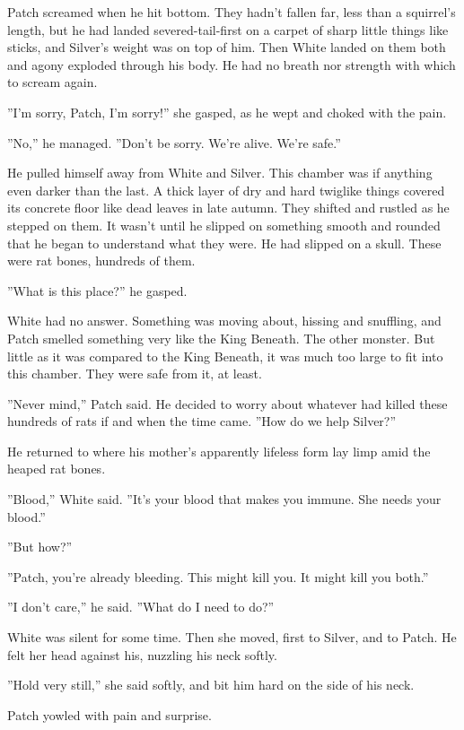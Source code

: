 \documentclass[12pt]{book}
\begin{document}
Patch screamed when he hit bottom. They hadn't fallen far, less than a squirrel's length, but he had landed severed-tail-first on a carpet of sharp little things like sticks, and Silver's weight was on top of him. Then White landed on them both and agony exploded through his body. He had no breath nor strength with which to scream again.\par
''I'm sorry, Patch, I'm sorry!'' she gasped, as he wept and choked with the pain.\par
''No,'' he managed. ''Don't be sorry. We're alive. We're safe.''\par
He pulled himself away from White and Silver. This chamber was if anything even darker than the last. A thick layer of dry and hard twiglike things covered its concrete floor like dead leaves in late autumn. They shifted and rustled as he stepped on them. It wasn't until he slipped on something smooth and rounded that he began to understand what they were. He had slipped on a skull. These were rat bones, hundreds of them.\par
''What is this place?'' he gasped.\par
White had no answer. Something was moving about, hissing and snuffling, and Patch smelled something very like the King Beneath. The other monster. But little as it was compared to the King Beneath, it was much too large to fit into this chamber. They were safe %
 from it, at least. \par
''Never mind,'' Patch said. He decided to worry about whatever had killed these hundreds of rats if and when the time came. ''How do we help Silver?''\par
He returned to where his mother's apparently lifeless form lay limp amid the heaped rat bones.\par
''Blood,'' White said. ''It's your blood that makes you immune. She needs your blood.''\par
''But %
 how?''\par
''Patch, you're already bleeding. This might kill you. It might kill you both.''\par
''I don't care,'' he said. ''What do I need to do?''\par
White was silent for some time. Then she moved, first to Silver, and to Patch. He felt her head against his, nuzzling his neck softly.\par
''Hold very still,'' she said softly, and bit him hard on the side of his neck.\par
Patch yowled with pain and surprise.\par
\end{document}
